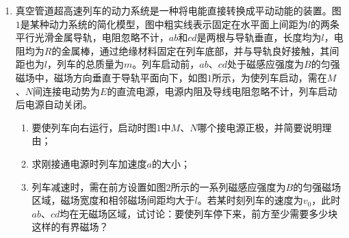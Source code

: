 \begin{enumerate}
{\begin{enumerate}
\end{enumerate}
}







\newpage
\item
{}
真空管道超高速列车的动力系统是一种将电能直接转换成平动动能的装置。图$ 1 $是某种动力系统的简化模型，图中粗实线表示固定在水平面上间距为$ l $的两条平行光滑金属导轨，电阻忽略不计，$ ab $和$ cd $是两根与导轨垂直，长度均为$ l $，电阻均为$ R $的金属棒，通过绝缘材料固定在列车底部，并与导轨良好接触，其间距也为$ l $，列车的总质量为$ m $。列车启动前，$ ab $、$ cd $处于磁感应强度为$ B $的匀强磁场中，磁场方向垂直于导轨平面向下，如图$ 1 $所示，为使列车启动，需在$ M $、$ N $间连接电动势为$ E $的直流电源，电源内阻及导线电阻忽略不计，列车启动后电源自动关闭。
\begin{enumerate}
\renewcommand{\labelenumi}{\arabic{enumi}.}
\item
要使列车向右运行，启动时图$ 1 $中$ M $、$ N $哪个接电源正极，并简要说明理由；
\item 
求刚接通电源时列车加速度$ a $的大小；
\item 
列车减速时，需在前方设置如图$ 2 $所示的一系列磁感应强度为$ B $的匀强磁场区域，磁场宽度和相邻磁场间距均大于$ l $。若某时刻列车的速度为$ v_{0} $，此时$ ab $、$ cd $均在无磁场区域，试讨论：要使列车停下来，前方至少需要多少块这样的有界磁场？



\end{enumerate}
\begin{figure}[h!]
\flushright
\begin{subfigure}{0.4\linewidth}
	\centering
	 
	\caption{}\label{}
\end{subfigure}
\begin{subfigure}{0.4\linewidth}
	\centering
	 
	\caption{}\label{}
\end{subfigure}
\end{figure}



\end{enumerate}
